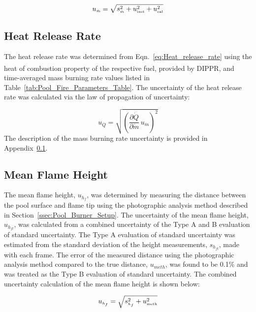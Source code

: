 \documentclass[12pt]{article}
\begin{document}
\begin{equation}
\label{eq:mass_rate_uncertainty}
u_{\scriptscriptstyle \dot{m}} = \sqrt{s_{\scriptscriptstyle \dot{m}}^2+u_{\rm \scriptscriptstyle inst}^2+u_{\rm \scriptscriptstyle cal}^2}
\end{equation}

\subsection{Heat Release Rate}
\label{ssec:Heat_Release_Rate}
The heat release rate was determined from Eqn.~\ref{eq:Heat_release_rate} using the heat of combustion property of the respective fuel, provided by DIPPR\textsuperscript{\textregistered}, and time-averaged mass burning rate values listed in Table~\ref{tab:Pool_Fire_Parameters_Table}. The uncertainty of the heat release rate was calculated via the law of propagation of uncertainty:

\begin{equation}
\label{eq:heat_release_rate_uncertainty}
u_{\scriptscriptstyle \dot{Q}} = \sqrt{{\left(\frac{\partial \dot{Q}}{\partial \dot{m}}\,u_{\scriptscriptstyle \dot{m}} \right)}^2}
\end{equation}
The description of the mass burning rate uncertainty is provided in Appendix~\ref{ssec:Heat_Release_Rate}.

\subsection{Mean Flame Height}
\label{ssec:Mean_Flame_Height}
The mean flame height, $u_{h_{f}}$, was determined by measuring the distance between the pool surface and flame tip using the photographic analysis method described in Section~\ref{ssec:Pool_Burner_Setup}. The uncertainty of the mean flame height, $u_{\scriptscriptstyle h_{fl}}$, was calculated from a combined uncertainty of the Type A and B evaluation of standard uncertainty. The Type A evaluation of standard uncertainty was estimated from the standard deviation of the height measurements, $s_{\scriptscriptstyle h_{fl}}$, made with each frame. The error of the measured distance using the photographic analysis method compared to the true distance, $u_{\scriptscriptstyle meth}$,  was found to be 0.1\% and was treated as the Type B evaluation of standard uncertainty. The combined uncertainty calculation of the mean flame height is shown below:

\begin{equation}
\label{eq:mean_flame_height}
u_{\scriptscriptstyle h_{f}} = \sqrt{s_{\scriptscriptstyle{h_{f}}}^2+u_{\rm \scriptscriptstyle meth}^2}
\end{equation}
\end{document}
